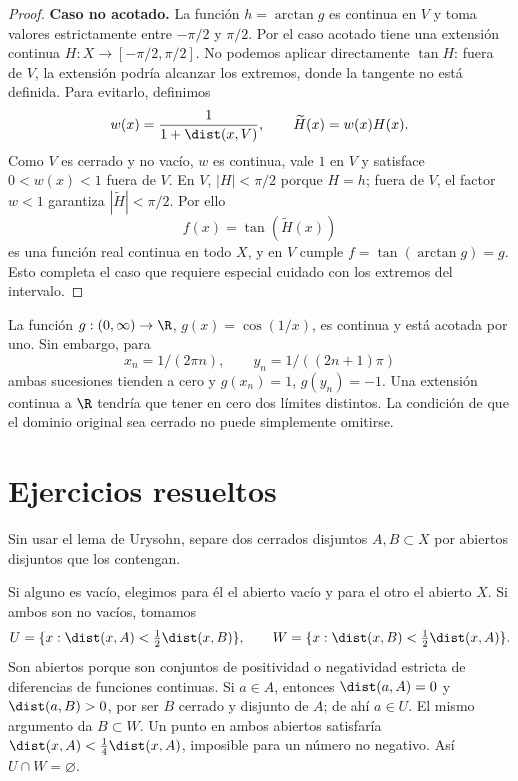 \begin{proof}
\textbf{Caso no acotado.} La función $h=\arctan g$ es continua en $V$ y toma valores estrictamente entre $-\pi/2$ y $\pi/2$. Por el caso acotado tiene una extensión continua $H:X\to[-\pi/2,\pi/2]$. No podemos aplicar directamente $\tan H$: fuera de $V$, la extensión podría alcanzar los extremos, donde la tangente no está definida. Para evitarlo, definimos
\[
 w(x)=\frac1{1+\dist(x,V)},\qquad \widetilde H(x)=w(x)H(x).
\]
Como $V$ es cerrado y no vacío, $w$ es continua, vale $1$ en $V$ y satisface $0<w(x)<1$ fuera de $V$. En $V$, $|H|<\pi/2$ porque $H=h$; fuera de $V$, el factor $w<1$ garantiza $|\widetilde H|<\pi/2$. Por ello
\[
 f(x)=\tan(\widetilde H(x))
\]
es una función real continua en todo $X$, y en $V$ cumple $f=\tan(\arctan g)=g$. Esto completa el caso que requiere especial cuidado con los extremos del intervalo.
\end{proof}

\begin{ejemplo}
La función $g:(0,\infty)\to\R$, $g(x)=\cos(1/x)$, es continua y está acotada por uno. Sin embargo, para
\[
 x_n=1/(2\pi n),\qquad y_n=1/((2n+1)\pi)
\]
ambas sucesiones tienden a cero y $g(x_n)=1$, $g(y_n)=-1$. Una extensión continua a $\R$ tendría que tener en cero dos límites distintos. La condición de que el dominio original sea cerrado no puede simplemente omitirse.
\end{ejemplo}

\section{Ejercicios resueltos}
\begin{ejercicio}
Sin usar el lema de Urysohn, separe dos cerrados disjuntos $A,B\subset X$ por abiertos disjuntos que los contengan.
\end{ejercicio}
\begin{solucion}
Si alguno es vacío, elegimos para él el abierto vacío y para el otro el abierto $X$. Si ambos son no vacíos, tomamos
\[
 U=\{x:\dist(x,A)<\tfrac12\dist(x,B)\},\qquad
 W=\{x:\dist(x,B)<\tfrac12\dist(x,A)\}.
\]
Son abiertos porque son conjuntos de positividad o negatividad estricta de diferencias de funciones continuas. Si $a\in A$, entonces $\dist(a,A)=0$ y $\dist(a,B)>0$, por ser $B$ cerrado y disjunto de $A$; de ahí $a\in U$. El mismo argumento da $B\subset W$. Un punto en ambos abiertos satisfaría $\dist(x,A)<\frac14\dist(x,A)$, imposible para un número no negativo. Así $U\cap W=\varnothing$.
\end{solucion}

